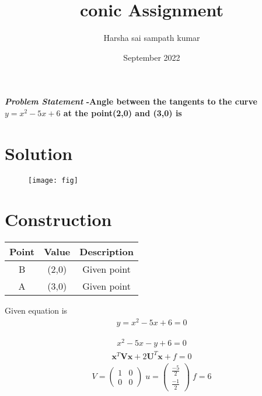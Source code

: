 \documentclass[journal,10pt,twocolumn]{article}
\title{\textbf{conic Assignment}}
\author{Harsha sai sampath kumar}
\date{September 2022}
\let\vec\mathbf
\newcommand{\myvec}[1]{\ensuremath{\begin{pmatrix}#1\end{pmatrix}}}
\begin{document}
\maketitle
\paragraph{\textit{\large Problem Statement} -Angle between the tangents to the curve $y=x^2-5x+6$ at the point(2,0) and (3,0) is }

\section*{\large Solution}

\begin{figure}[H]
\centering
\texttt{[image: fig]}
\caption{}
\end{figure}

\section{Construction}
\begin{tabular}{|c|c|c|}
  \hline
  \textbf{Point}&\textbf{Value}&\textbf{Description}\\
  \hline
  B&(2,0)&  Given point\\
  \hline
  A&(3,0)& Given point\\
  \hline
  
  
  
\end{tabular}









Given  equation is \begin{align}
y=x^2-5x+6=0
\end{align}




\begin{align}
x^2-5x-y+6=0
\end{align}
\begin{align}
\vec{x}^T\vec{Vx}+2\vec{U}^T\vec{x}+f=0
\end{align}
\begin{eqnarray}
V=\myvec{1&0\\ 0 &0} \; u=\myvec{\frac{-5}{2}\\\frac{-1}{2}} \;  f=6
\end{eqnarray}
\end{document}
